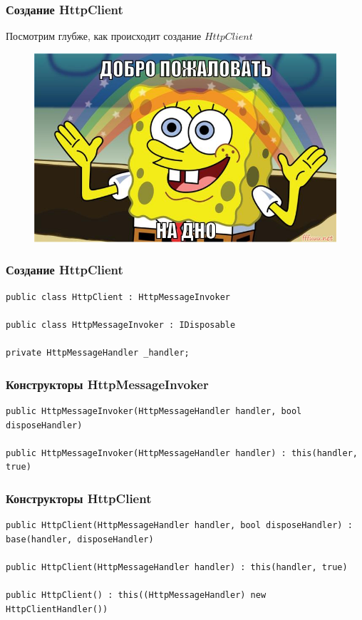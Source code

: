 \documentclass[17pt,aspectratio=169]{beamer}
\begin{document}
\begin{frame}[fragile]
\frametitle{Создание HttpClient}
Посмотрим глубже, как происходит создание $HttpClient$
\newline
\begin{figure}
\includegraphics[scale=0.4]{dno}
\end{figure}
\end{frame}

\begin{frame}[fragile]
\frametitle{Создание HttpClient}
\begin{lstlisting}
public class HttpClient : HttpMessageInvoker

public class HttpMessageInvoker : IDisposable

private HttpMessageHandler _handler;
\end{lstlisting}
\end{frame}

\begin{frame}[fragile]
\frametitle{Конструкторы HttpMessageInvoker}
\begin{lstlisting}
public HttpMessageInvoker(HttpMessageHandler handler, bool disposeHandler)

public HttpMessageInvoker(HttpMessageHandler handler) : this(handler, true)
\end{lstlisting}
\end{frame}

\begin{frame}[fragile]
\frametitle{Конструкторы HttpClient}
\begin{lstlisting}
public HttpClient(HttpMessageHandler handler, bool disposeHandler) : base(handler, disposeHandler)

public HttpClient(HttpMessageHandler handler) : this(handler, true)

public HttpClient() : this((HttpMessageHandler) new HttpClientHandler())
\end{lstlisting}
\end{frame}
\end{document}
